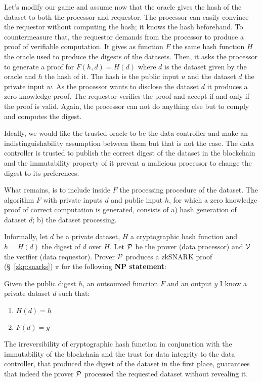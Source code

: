Let's modify our game and assume now that the oracle gives the hash of the dataset to both the processor and requestor. The processor can easily convince the requestor without computing the hash; it knows the hash beforehand. To countermeasure that, the requestor demands from the processor to produce a proof of verifiable computation. It gives as function $F$ the same hash function $H$ the oracle used to produce the digests of the datasets. Then, it asks the processor to generate a proof for $F(h, d) = H(d)$ where $d$ is the dataset given by the oracle and $h$ the hash of it. The hash is the public input $u$ and the dataset $d$ the private input $w$. As the processor wants to disclose the dataset $d$ it produces a zero knowledge proof. The requestor verifies the proof and accept if and only if the proof is valid. Again, the processor can not do anything else but to comply and computes the digest.

Ideally, we would like the trusted oracle to be the data controller and make an indistinguishability assumption between them but that is not the case. The data controller is trusted to publish the correct digest of the dataset in the blockchain and the immutability property of it prevent a malicious processor to change the digest to its preferences.

What remains, is to include inside $F$ the processing procedure of the dataset. The algorithm $F$ with private inputs $d$ and public input $h$, for which a zero knowledge proof of correct computation is generated, consists of a) hash generation of dataset $d$; b) the dataset processing.

Informally, let $d$ be a private dataset, $H$ a cryptographic hash function and $h = H(d)$ the digest of $d$ over $H$. Let $\mathcal{P}$ be the prover (data processor) and $\mathcal{V}$ the verifier (data requestor). Prover $\mathcal{P}$ produces a zkSNARK proof (§~\ref{zkp:snarks}) $\pi$ for the following \textbf{NP statement}:

Given the public digest $h$, an outsourced function $F$ and an output $y$ I know a private dataset $d$ such that:
  \begin{enumerate}
    \item $H(d) = h$
    \item $F(d) = y$
  \end{enumerate}

The irreversibility of cryptographic hash function in conjunction with the immutability of the blockchain and the trust for data integrity to the data controller, that produced the digest of the dataset in the first place, guarantees that indeed the prover $\mathcal{P}$ processed the requested dataset without revealing it.

